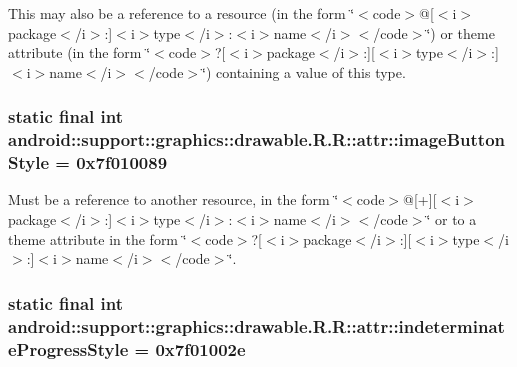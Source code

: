 This may also be a reference to a resource (in the form \char`\"{}$<$code$>$@\mbox{[}$<$i$>$package$<$/i$>$:\mbox{]}$<$i$>$type$<$/i$>$:$<$i$>$name$<$/i$>$$<$/code$>$\char`\"{}) or theme attribute (in the form \char`\"{}$<$code$>$?\mbox{[}$<$i$>$package$<$/i$>$:\mbox{]}\mbox{[}$<$i$>$type$<$/i$>$:\mbox{]}$<$i$>$name$<$/i$>$$<$/code$>$\char`\"{}) containing a value of this type. \hypertarget{classandroid_1_1support_1_1graphics_1_1drawable_1_1_r_1_1attr_38540dc343ec2e52fa13bc24f65e69d1}{
\subsubsection[{imageButtonStyle}]{\setlength{\rightskip}{0pt plus 5cm}static final int android::support::graphics::drawable.R.R::attr::imageButtonStyle = 0x7f010089}}
\label{classandroid_1_1support_1_1graphics_1_1drawable_1_1_r_1_1attr_38540dc343ec2e52fa13bc24f65e69d1}


Must be a reference to another resource, in the form \char`\"{}$<$code$>$@\mbox{[}+\mbox{]}\mbox{[}$<$i$>$package$<$/i$>$:\mbox{]}$<$i$>$type$<$/i$>$:$<$i$>$name$<$/i$>$$<$/code$>$\char`\"{} or to a theme attribute in the form \char`\"{}$<$code$>$?\mbox{[}$<$i$>$package$<$/i$>$:\mbox{]}\mbox{[}$<$i$>$type$<$/i$>$:\mbox{]}$<$i$>$name$<$/i$>$$<$/code$>$\char`\"{}. \hypertarget{classandroid_1_1support_1_1graphics_1_1drawable_1_1_r_1_1attr_4e694a00c1feb23683305b8c1c8de716}{
\subsubsection[{indeterminateProgressStyle}]{\setlength{\rightskip}{0pt plus 5cm}static final int android::support::graphics::drawable.R.R::attr::indeterminateProgressStyle = 0x7f01002e}}
\label{classandroid_1_1support_1_1graphics_1_1drawable_1_1_r_1_1attr_4e694a00c1feb23683305b8c1c8de716}


